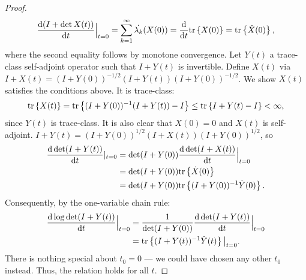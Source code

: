 \documentclass{article}
\begin{document}
\begin{proof}
\begin{align*}
    \frac{\text{\textup{d}} (I+\det X(t))}{\text{\textup{d}} t}\Big |_{t=0} 
    = \sum_{k=1}^{\infty} \dot{\lambda_k}(X(0)) 
    = \frac{\text{\textup{d}} }{\text{\textup{d}} t}\textup{tr}\left \{X(0) \right \}
    = \textup{tr}\left \{\dot{X}(0) \right \},
  \end{align*}
  where the second equality follows by monotone convergence. 
  Let $Y(t)$ a trace-class self-adjoint operator such that 
  $I+Y(t)$ is invertible.
  Define $X(t)$ via $I+X(t) = (I+Y(0))^{-1/2} (I+Y(t)) (I+Y(0))^{-1/2}$. 
  We show $X(t)$ satisfies the conditions above. It is trace-class:
  \begin{align*}
    \textup{tr}\left \{X(t) \right \} = \textup{tr}\left \{(I+Y(0))^{-1} (I+Y(t)) - I \right \}
    \leq \textup{tr}\left \{I+Y(t) - I \right \}< \infty,
  \end{align*}
  since $Y(t)$ is trace-class. It is also clear that
  $X(0) = 0$ and $X(t)$ is self-adjoint.
  $I+Y(t) = (I+Y(0))^{1/2}(I+X(t))(I+Y(0))^{1/2}$, so
  \begin{align*}
    \frac{\text{\textup{d}} \det (I+Y(t))}{\text{\textup{d}} t}|_{t=0} 
    &= \det (I+Y(0))\frac{\text{\textup{d}} \det (I+X(t))}{\text{\textup{d}} t}\Big |_{t=0} \\
    &= \det (I+Y(0)) \textup{tr}\left \{\dot{X}(0) \right \} \\
    &= \det (I+Y(0)) \textup{tr}\left \{(I+Y(0))^{-1} \dot{Y}(0) \right \}.
  \end{align*}
  Consequently, by the one-variable chain rule:
  \begin{align*}
    \frac{\text{\textup{d}} \log \det (I+Y(t))}{\text{\textup{d}} t}\Big |_{t=0} &=
    \frac{1}{\det (I+Y(0))}\frac{\text{\textup{d}} \det (I+Y(t))}{\text{\textup{d}} t}\Big |_{t=0} \\ 
    &= \textup{tr}\left \{ (I+Y(t))^{-1} \dot{Y}(t) \right \} \big |_{t=0}.
  \end{align*}
  There is nothing special about $t_0 = 0$ --- we could have chosen
  any other $t_0$ instead. Thus, the relation holds for all $t$.
\end{proof}
\end{document}
